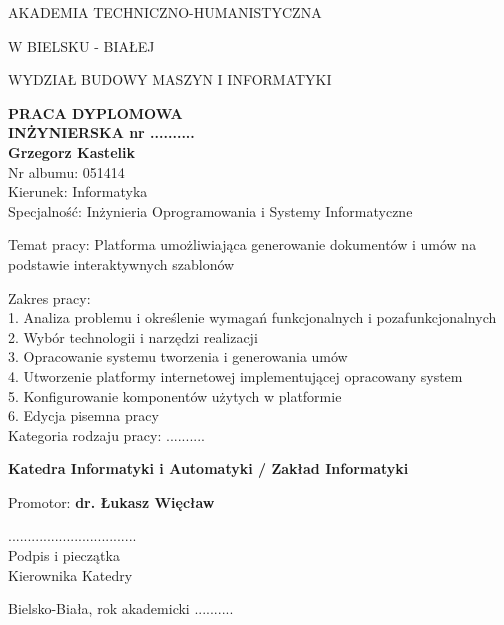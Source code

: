 \thispagestyle{empty}

\begin{center}

    AKADEMIA TECHNICZNO-HUMANISTYCZNA

    W BIELSKU - BIAŁEJ
    \vspace{0.5cm}
    
    WYDZIAŁ BUDOWY MASZYN I INFORMATYKI
    \vspace{0.6cm}

    \textbf{ {\Large PRACA DYPLOMOWA} \\
    INŻYNIERSKA nr .......... \\
    Grzegorz Kastelik \\}
    \vspace{0.5cm}
    {\small
    Nr albumu: 051414 \\
    Kierunek: Informatyka \\
    Specjalność: Inżynieria Oprogramowania i Systemy Informatyczne \\}
    \vspace{0.5cm}

    Temat pracy: Platforma umożliwiająca generowanie dokumentów i umów na podstawie interaktywnych szablonów 



    {\small 
        \begin{flushleft}
            Zakres pracy:\\
            1. Analiza problemu i określenie wymagań funkcjonalnych i pozafunkcjonalnych  \\
            2. Wybór technologii i narzędzi realizacji \\
            3. Opracowanie systemu tworzenia i generowania umów \\
            4. Utworzenie platformy internetowej implementującej opracowany system \\
            5. Konfigurowanie komponentów użytych w platformie \\
            6. Edycja pisemna pracy \\
            \vspace{0.5cm}
            Kategoria rodzaju pracy: ..........
        \end{flushleft}
    
        \textbf{Katedra Informatyki i Automatyki / Zakład Informatyki}
    
        \begin{flushleft}
            Promotor: \textbf{dr. Łukasz Więcław}
        \end{flushleft}
    
        \begin{flushright}
            ................................. \\
            Podpis i pieczątka \\
            Kierownika Katedry \\
        \end{flushright}
        
        Bielsko-Biała, rok akademicki ..........
    }

\end{center}

\newpage